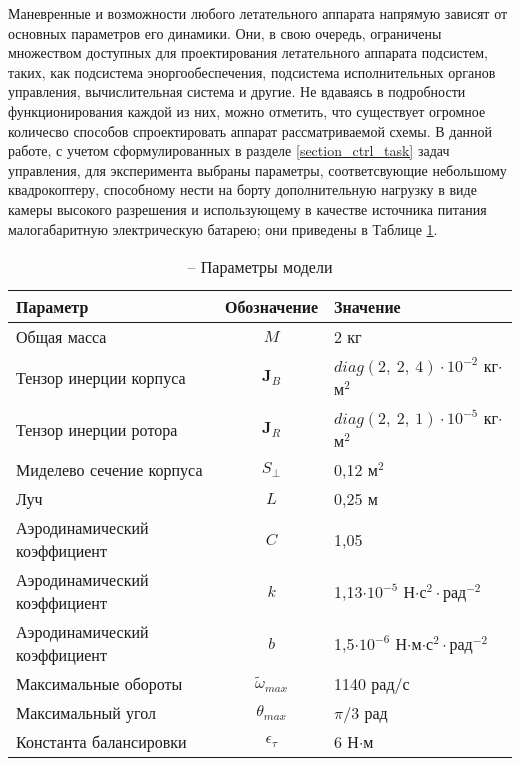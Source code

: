 Маневренные и возможности любого летательного аппарата напрямую зависят от основных параметров его динамики.
Они, в свою очередь, ограничены множеством доступных для проектирования летательного аппарата подсистем, таких, как подсистема эноргообеспечения, подсистема исполнительных органов управления, вычислительная система и другие.
Не вдаваясь в подробности функционирования каждой из них, можно отметить, что существует огромное количесво способов спроектировать аппарат рассматриваемой схемы.
В данной работе, с учетом сформулированных в разделе \ref{section_ctrl_task} задач управления, для эксперимента выбраны параметры, соответсвующие небольшому квадрокоптеру, способному нести на борту дополнительную нагрузку в виде камеры высокого разрешения и использующему в качестве источника питания малогабаритную электрическую батарею; они приведены в Таблице \ref{tb:params_table}.
\begin{table}[h!]
	\centering
	\caption{ -- Параметры модели}\label{tb:params_table} 
	\begin{tabular}{lcl}
		\hline
		Параметр & Обозначение & Значение  \\\hline
		Общая масса & $M$ & 2 кг  \\
		Тензор инерции корпуса & $\bm J_B$ & $diag(2,\ 2,\ 4)\cdot{10^{-2}}$ кг$\cdot$м$^2$  \\
		Тензор инерции ротора & $\bm J_R$ & $diag(2,\ 2,\ 1)\cdot{10^{-5}}$ кг$\cdot$м$^2$  \\
		Миделево сечение корпуса & $S_{\perp}$ & 0,12 м$^2$ \\
		Луч & $L$ & 0,25 м \\
		Аэродинамический коэффициент & $C$ & 1,05\\
		Аэродинамический коэффициент & $k$ & 1,13$\cdot 10^{-5}$ Н$\cdot$с$^2\cdot$рад$^{-2}$ \\		
		Аэродинамический коэффициент & $b$ & 1,5$\cdot 10^{-6}$ Н$\cdot$м$\cdot$с$^2\cdot$рад$^{-2}$ \\		
		Максимальные обороты & $\tilde \omega_{max}$ & 1140 рад/с \\		
		Максимальный угол & $\theta_{max}$ & ${\pi}/{3}$ рад \\
		Константа балансировки & $\epsilon_\tau$ &6 Н$\cdot$м \\
		\hline
	\end{tabular}
\end{table}

